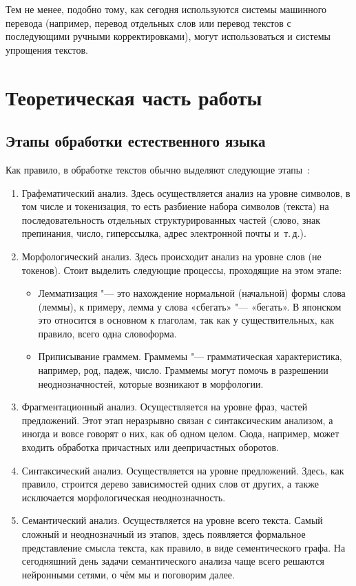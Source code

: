 Тем не менее, подобно тому, как сегодня используются системы машинного перевода (например, перевод отдельных слов или перевод текстов с последующими ручными корректировками), могут использоваться и системы упрощения текстов.


\chapter{Теоретическая часть работы}


\section{Этапы обработки естественного языка}


Как правило, в обработке текстов обычно выделяют следующие этапы~\cite[с.~9]{Batruha}:
\begin{enumerate}[1.]%
  \item Графематический анализ.
    Здесь осуществляется анализ на уровне символов, в том числе и токенизация, то есть разбиение набора символов (текста) на последовательность отдельных структурированных частей (слово, знак препинания, число, гиперссылка, адрес электронной почты и~т.\,д.).
  \item Морфологический анализ.
    Здесь происходит анализ на уровне слов (не токенов).
    Стоит выделить следующие процессы, проходящие на этом этапе:
    \begin{itemize}%
      \item Лемматизация
        "--- это нахождение нормальной (начальной) формы слова (леммы), к примеру, лемма у слова «сбегать» "--- «бегать».
        В японском это относится в основном к глаголам, так как у существительных, как правило, всего одна словоформа. 
      \item Приписывание граммем.
        Граммемы "--- грамматическая характеристика, например, род, падеж, число.
        Граммемы могут помочь в разрешении неоднозначностей, которые возникают в морфологии.
    \end{itemize}
  \item Фрагментационный анализ.
    Осуществляется на уровне фраз, частей предложений. Этот этап неразрывно связан с синтаксическим анализом, а иногда и вовсе говорят о них, как об одном целом. Сюда, например, может входить обработка причастных или деепричастных оборотов.
  \item Синтаксический анализ.
    Осуществляется на уровне предложений.
    Здесь, как правило, строится дерево зависимостей одних слов от других, а также исключается морфологическая неоднозначность.
  \item Семантический анализ.
    Осуществляется на уровне всего текста.
    Самый сложный и неоднозначный из этапов, здесь появляется формальное представление смысла текста, как правило, в виде сементического графа.
    На сегодняшний день задачи семантического анализа чаще всего решаются нейронными сетями, о чём мы и поговорим далее.
\end{enumerate}


